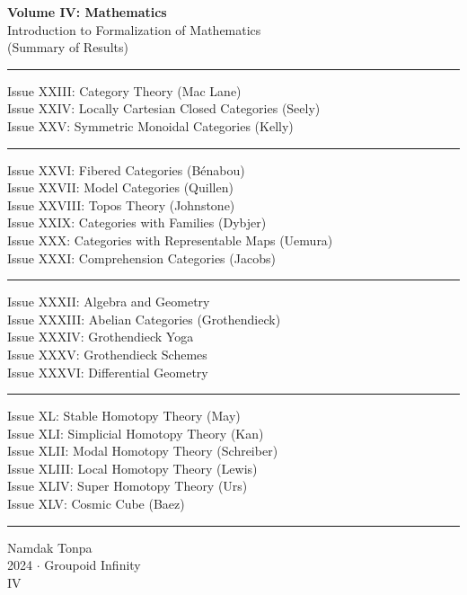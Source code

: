 \documentclass{article}
\begin{document}
\begin{titlepage}
    \centering
    \vspace*{0.5in}
    \Huge
    \textbf{Volume IV: Mathematics} \\
    \LARGE
    Introduction to Formalization of Mathematics \\
    (Summary of Results) \\
    \vspace{1.5in}
    \small
    \flushleft
    \vspace{-2mm} \rule{\textwidth}{0.4pt}
    Issue XXIII: Category Theory (Mac Lane) \\
    Issue XXIV: Locally Cartesian Closed Categories (Seely) \\
    Issue XXV: Symmetric Monoidal Categories (Kelly) \\
    \vspace{-2mm} \rule{\textwidth}{0.4pt}
    Issue XXVI: Fibered Categories (Bénabou) \\
    Issue XXVII: Model Categories (Quillen) \\
    Issue XXVIII: Topos Theory (Johnstone) \\
    Issue XXIX: Categories with Families (Dybjer) \\
    Issue XXX: Categories with Representable Maps (Uemura) \\
    Issue XXXI: Comprehension Categories (Jacobs) \\
    \vspace{-2mm} \rule{\textwidth}{0.4pt}
    Issue XXXII: Algebra and Geometry \\
    Issue XXXIII: Abelian Categories (Grothendieck) \\
    Issue XXXIV: Grothendieck Yoga \\
    Issue XXXV: Grothendieck Schemes \\
    Issue XXXVI: Differential Geometry \\
    \vspace{-2mm} \rule{\textwidth}{0.4pt}
    Issue XL: Stable Homotopy Theory (May) \\
    Issue XLI: Simplicial Homotopy Theory (Kan) \\
    Issue XLII: Modal Homotopy Theory (Schreiber) \\
    Issue XLIII: Local Homotopy Theory (Lewis) \\
    Issue XLIV: Super Homotopy Theory (Urs) \\
    Issue XLV: Cosmic Cube (Baez) \\
    \vspace{-2mm} \rule{\textwidth}{0.4pt}
    \centering
    \vfill
    \large
    Namdak Tonpa \\
    \Large
    2024 $\cdot$ Groupoid Infinity \\
    IV
\end{titlepage}
\end{document}
